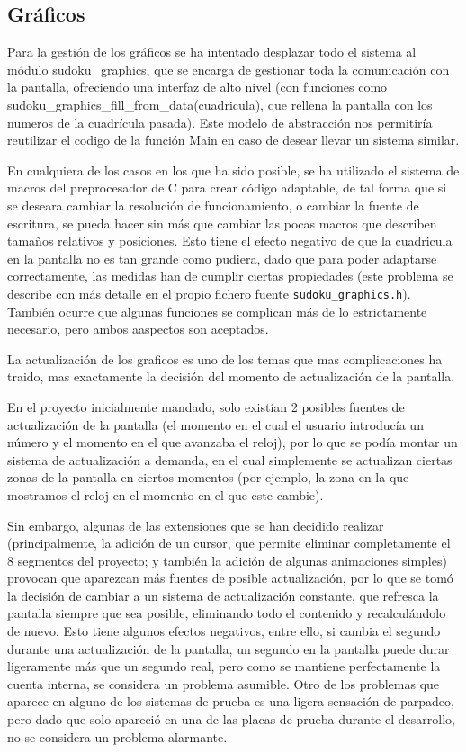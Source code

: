 \documentclass[12pt,letterpaper]{article}
\begin{document}
\subsection{Gráficos}
\label{subsec:graficos}
Para la gestión de los gráficos se ha intentado desplazar todo el
sistema al módulo sudoku\_graphics, que se encarga de gestionar toda
la comunicación con la pantalla, ofreciendo una interfaz de alto nivel
(con funciones como sudoku\_graphics\_fill\_from\_data(cuadricula),
que rellena la pantalla con los numeros de la cuadrícula pasada). Este
modelo de abstracción nos permitiría reutilizar el codigo de la
función Main en caso de desear llevar un sistema similar.

En cualquiera de los casos en los que ha sido posible, se ha utilizado
el sistema de macros del preprocesador de C para crear código
adaptable, de tal forma que si se deseara cambiar la resolución de
funcionamiento, o cambiar la fuente de escritura, se pueda hacer sin
más que cambiar las pocas macros que describen tamaños relativos y
posiciones. Esto tiene el efecto negativo de que la cuadricula en la
pantalla no es tan grande como pudiera, dado que para poder adaptarse
correctamente, las medidas han de cumplir ciertas propiedades (este
problema se describe con más detalle en el propio fichero fuente
\texttt{sudoku\_graphics.h}). También ocurre que algunas funciones se
complican más de lo estrictamente necesario, pero ambos aaspectos son
aceptados.

La actualización de los graficos es uno de los temas que mas
complicaciones ha traido, mas exactamente la decisión del momento de
actualización de la pantalla.

En el proyecto inicialmente mandado, solo existían 2 posibles fuentes
de actualización de la pantalla (el momento en el cual el usuario
introducía un número y el momento en el que avanzaba el reloj), por lo
que se podía montar un sistema de actualización a demanda, en el cual
simplemente se actualizan ciertas zonas de la pantalla en ciertos
momentos (por ejemplo, la zona en la que mostramos el reloj en el
momento en el que este cambie).

Sin embargo, algunas de las extensiones que se han decidido realizar
(principalmente, la adición de un cursor, que permite eliminar
completamente el 8 segmentos del proyecto; y también la adición de
algunas animaciones simples) provocan que aparezcan más fuentes de
posible actualización, por lo que se tomó la decisión de cambiar a un
sistema de actualización constante, que refresca la pantalla siempre
que sea posible, eliminando todo el contenido y recalculándolo de
nuevo. Esto tiene algunos efectos negativos, entre ello, si cambia el
segundo durante una actualización de la pantalla, un segundo en la
pantalla puede durar ligeramente más que un segundo real, pero como se
mantiene perfectamente la cuenta interna, se considera un problema
asumible. Otro de los problemas que aparece en alguno de los sistemas
de prueba es una ligera sensación de parpadeo, pero dado que solo
apareció en una de las placas de prueba durante el desarrollo, no se
considera un problema alarmante.\\
\end{document}
